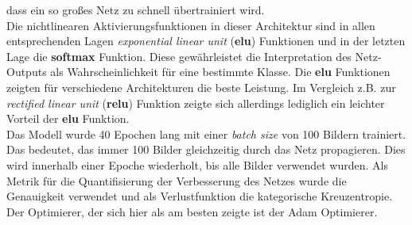dass ein so großes Netz zu schnell übertrainiert wird. \\
Die nichtlinearen Aktivierungsfunktionen in dieser Architektur sind in allen
entsprechenden Lagen \textit{exponential linear unit} (\textbf{elu}) Funktionen und in der letzten Lage die
\textbf{softmax} Funktion. Diese gewährleistet die Interpretation des
Netz-Outputs als Wahrscheinlichkeit für eine bestimmte Klasse.
Die \textbf{elu} Funktionen zeigten für verschiedene Architekturen die beste
Leistung. Im Vergleich z.B. zur \textit{rectified linear unit} (\textbf{relu}) Funktion zeigte sich allerdings
lediglich ein leichter Vorteil der \textbf{elu} Funktion.\\
Das Modell wurde 40 Epochen lang mit einer \textit{batch size} von 100 Bildern
trainiert. Das bedeutet, das immer 100 Bilder gleichzeitig durch das Netz
propagieren. Dies wird innerhalb einer Epoche wiederholt, bis alle Bilder
verwendet wurden. Als Metrik für die Quantifisierung der Verbesserung des
Netzes wurde die Genauigkeit verwendet und als Verlustfunktion die
kategorische Kreuzentropie. Der Optimierer, der sich hier als am besten zeigte
ist der Adam Optimierer.

